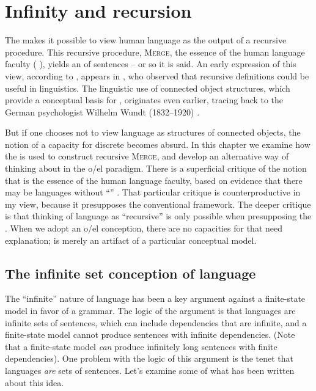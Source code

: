 \chapter{Infinity and recursion}

The  makes it possible to view human language as the output of a recursive procedure. This recursive procedure, \textsc{Merge}, the essence of the human language faculty (\citeauthor{Chomsky2001b} \citeyear*{Chomsky2001b,Chomsky2008}), yields an  of sentences -- or so it is said. An early expression of this view, according to \citet{Tomalin2007}, appears in \citet{Bar-Hillel1953recursive}, who observed that recursive definitions could be useful in linguistics. The linguistic use of connected object structures, which provide a conceptual basis for , originates even earlier, tracing back to the German psychologist Wilhelm Wundt (1832--1920) \citep{Seuren1998}.

  But if one chooses not to view language as structures of connected objects, the notion of a capacity for discrete  becomes absurd. In this chapter we examine how the  is used to construct recursive \textsc{Merge}, and develop an alternative way of thinking about  in the o/el paradigm. There is a superficial critique of the notion that  is the essence of the human language faculty, based on evidence that there may be languages without “” \citep{Everett2005}. That particular critique is counterproductive in my view, because it presupposes the conventional framework. The deeper critique is that thinking of language as “recursive” is only possible when presupposing the . When we adopt an o/el conception, there are no capacities for  that need explanation;  is merely an artifact of a particular conceptual model.

\section{The infinite set conception of language}

The “infinite” nature of language has been a key argument against a finite-state model in favor of a  grammar. The logic of the argument is that languages are infinite sets of sentences, which can include dependencies that are infinite, and a finite-state model cannot produce sentences with infinite dependencies. (Note that a finite-state model \textit{can} produce infinitely long sentences with finite dependencies). One problem with the logic of this argument is the tenet that languages \textit{are} sets of sentences. Let's examine some of what has been written about this idea.  

